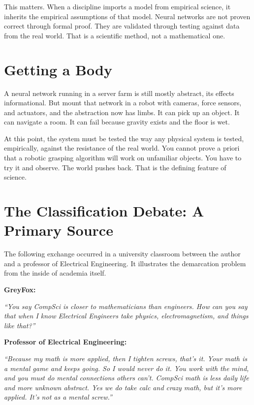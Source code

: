 \documentclass[11pt,a4paper]{article}
\newenvironment{speaker}[1]
  {\par\vspace{0.4em}\noindent\textbf{#1}\par\vspace{0.1em}%
   \list{}{\leftmargin=2.2em\rightmargin=2.2em\topsep=0.1em}\item\relax\itshape}
  {\endlist}
\begin{document}
This matters. When a discipline imports a model from empirical science, it inherits the empirical assumptions of that model. Neural networks are not proven correct through formal proof. They are validated through testing against data from the real world. That is a scientific method, not a mathematical one.

\section{Getting a Body}

A neural network running in a server farm is still mostly abstract, its effects informational. But mount that network in a robot with cameras, force sensors, and actuators, and the abstraction now has limbs. It can pick up an object. It can navigate a room. It can fail because gravity exists and the floor is wet.

At this point, the system must be tested the way any physical system is tested, empirically, against the resistance of the real world. You cannot prove a priori that a robotic grasping algorithm will work on unfamiliar objects. You have to try it and observe. The world pushes back. That is the defining feature of science.~\cite{popper1959}

\section{The Classification Debate: A Primary Source}

The following exchange occurred in a university classroom between the author and a professor of Electrical Engineering. It illustrates the demarcation problem from the inside of academia itself.

\begin{speaker}{GreyFox:}
``You say CompSci is closer to mathematicians than engineers. How can you say that when I know Electrical Engineers take physics, electromagnetism, and things like that?''
\end{speaker}

\begin{speaker}{Professor of Electrical Engineering:}
``Because my math is more applied, then I tighten screws, that's it. Your math is a mental game and keeps going. So I would never do it. You work with the mind, and you must do mental connections others can't. CompSci math is less daily life and more unknown abstract. Yes we do take calc and crazy math, but it's more applied. It's not as a mental screw.''
\end{speaker}
\end{document}
